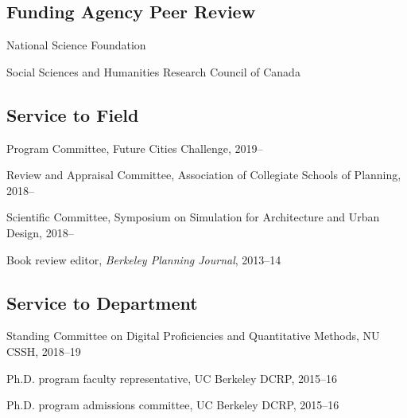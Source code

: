 \documentclass[12pt,letterpaper]{report}
\newcommand{\listitemspace}{0.15em}
\renewenvironment{itemize}
{\begin{list}{}{\setlength{\leftmargin}{0em}
			\setlength{\parskip}{0em}
			\setlength{\itemsep}{\listitemspace}
			\setlength{\parsep}{\listitemspace}}}
	{\end{list}}
\begin{document}
	\subsection*{Funding Agency Peer Review}

	\begin{itemize}

		\item National Science Foundation

		\item Social Sciences and Humanities Research Council of Canada

	\end{itemize}

	\subsection*{Service to Field}

	\begin{itemize}

		\item Program Committee, Future Cities Challenge, 2019--

		\item Review and Appraisal Committee, Association of Collegiate Schools of Planning, 2018--

		\item Scientific Committee, Symposium on Simulation for Architecture and Urban Design, 2018--

		\item Book review editor, \textit{Berkeley Planning Journal}, 2013--14

	\end{itemize}

	\subsection*{Service to Department}

	\begin{itemize}

		\item Standing Committee on Digital Proficiencies and Quantitative Methods, NU CSSH, 2018--19

		\item Ph.D. program faculty representative, UC Berkeley DCRP, 2015--16

		\item Ph.D. program admissions committee, UC Berkeley DCRP, 2015--16

	\end{itemize}
\end{document}
